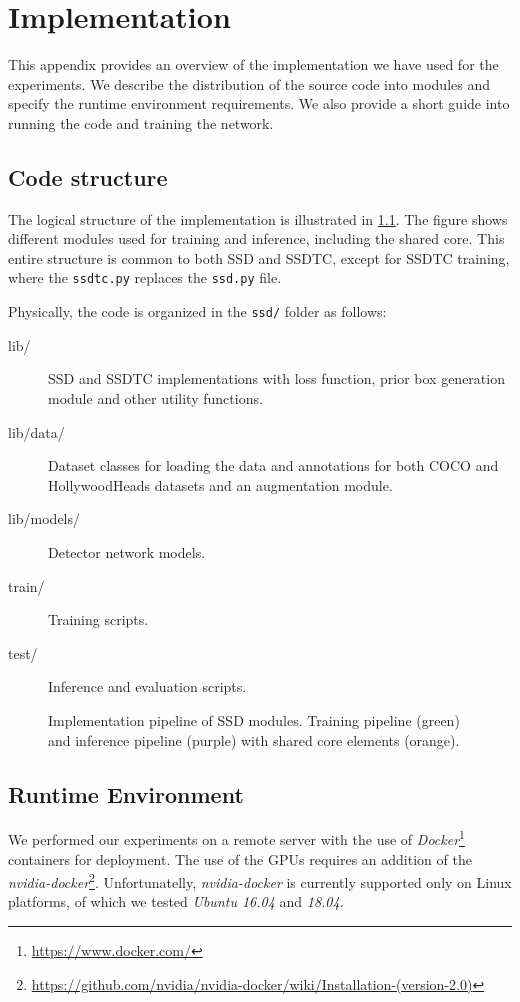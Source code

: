 \chapter{Implementation}
\label{app:impl}

This appendix provides an overview of the implementation we have used for the experiments. We describe the distribution of the source code into modules and specify the runtime environment requirements. We also provide a short guide into running the code and training the network.

\section{Code structure}
The logical structure of the implementation is illustrated in \cref{fig:logcode}. The figure shows different modules used for training and inference, including the shared core. This entire structure is common to both SSD and SSDTC, except for SSDTC training, where the {\tt ssdtc.py} replaces the {\tt ssd.py} file.

Physically, the code is organized in the {\tt ssd/} folder as follows:
\begin{description}
\item[lib/] SSD and SSDTC implementations with loss function, prior box generation module and other utility functions.
\item[lib/data/] Dataset classes for loading the data and annotations for both COCO and HollywoodHeads datasets and an augmentation module.
\item[lib/models/] Detector network models.
\item[train/] Training scripts.
\item[test/] Inference and evaluation scripts.
\end{description}

\begin{figure}
    \centering
    \modules
    \caption[Implementation pipeline of SSD modules]{Implementation pipeline of SSD modules. Training pipeline (green) and inference pipeline (purple) with shared core elements (orange).}
    \label{fig:logcode}
\end{figure}


\section{Runtime Environment}
We performed our experiments on a remote server with the use of \textit{Docker}\footnote{\url{https://www.docker.com/}} containers for deployment. The use of the GPUs requires an addition of the \textit{nvidia-docker}\footnote{\url{https://github.com/nvidia/nvidia-docker/wiki/Installation-(version-2.0)}}. Unfortunatelly, \textit{nvidia-docker} is currently supported only on Linux platforms, of which we tested \textit{Ubuntu 16.04} and \textit{18.04}.

